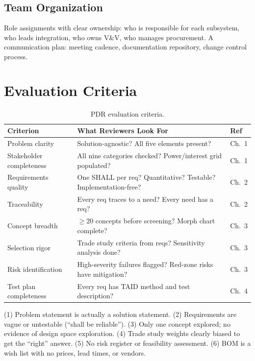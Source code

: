 \documentclass[11pt,letterpaper,twoside,openany]{book}
\begin{document}
\subsection{Team Organization}
Role assignments with clear ownership: who is responsible for each subsystem, who leads integration, who owns V\&V, who manages procurement. A communication plan: meeting cadence, documentation repository, change control process.


\section{Evaluation Criteria}

\begin{table}[htbp]\centering\small
\begin{tabularx}{\textwidth}{l X l}
\toprule
\textbf{Criterion} & \textbf{What Reviewers Look For} & \textbf{Ref} \\
\midrule
Problem clarity & Solution-agnostic? All five elements present? & Ch.~1 \\
Stakeholder completeness & All nine categories checked? Power/interest grid populated? & Ch.~1 \\
Requirements quality & One SHALL per req? Quantitative? Testable? Implementation-free? & Ch.~2 \\
Traceability & Every req traces to a need? Every need has a req? & Ch.~2 \\
Concept breadth & $\geq$20 concepts before screening? Morph chart complete? & Ch.~3 \\
Selection rigor & Trade study criteria from reqs? Sensitivity analysis done? & Ch.~3 \\
Risk identification & High-severity failures flagged? Red-zone risks have mitigation? & Ch.~3 \\
Test plan completeness & Every req has TAID method and test description? & Ch.~4 \\
\bottomrule
\end{tabularx}
\caption{PDR evaluation criteria.}
\end{table}

\begin{tipbox}
(1) Problem statement is actually a solution statement. (2) Requirements are vague or untestable (``shall be reliable''). (3) Only one concept explored; no evidence of design space exploration. (4) Trade study weights clearly biased to get the ``right'' answer. (5) No risk register or feasibility assessment. (6) BOM is a wish list with no prices, lead times, or vendors.
\end{tipbox}
\end{document}
